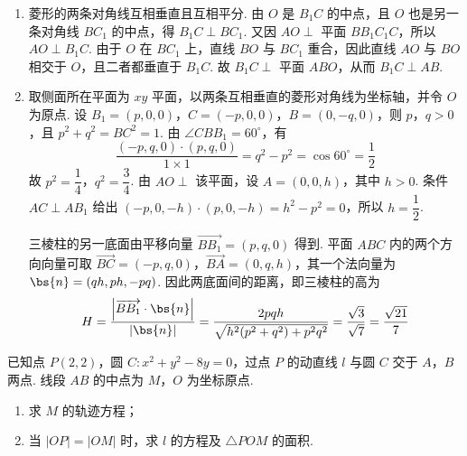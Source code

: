 \begin{solution}
\begin{enumerate}
\item 菱形的两条对角线互相垂直且互相平分. 由 \(O\) 是 \(B_1C\) 的中点，且 \(O\) 也是另一条对角线 \(BC_1\) 的中点，得 \(B_1C\perp BC_1\). 又因 \(AO\perp\) 平面 \(BB_1C_1C\)，所以 \(AO\perp B_1C\). 由于 \(O\) 在 \(BC_1\) 上，直线 \(BO\) 与 \(BC_1\) 重合，因此直线 \(AO\) 与 \(BO\) 相交于 \(O\)，且二者都垂直于 \(B_1C\). 故 \(B_1C\perp\) 平面 \(ABO\)，从而 \(B_1C\perp AB\).
\item 取侧面所在平面为 \(xy\) 平面，以两条互相垂直的菱形对角线为坐标轴，并令 \(O\) 为原点. 设 \(B_1=(p,0,0)\)，\(C=(-p,0,0)\)，\(B=(0,-q,0)\)，则 \(p\)，\(q>0\)，且 \(p^2+q^2=BC^2=1\). 由 \(\angle CBB_1=60^\circ\)，有
\[\frac{(-p,q,0)\cdot(p,q,0)}{1\times1}=q^2-p^2=\cos60^\circ=\frac12\]
故 \(p^2=\dfrac14\)，\(q^2=\dfrac34\). 由 \(AO\perp\) 该平面，设 \(A=(0,0,h)\)，其中 \(h>0\). 条件 \(AC\perp AB_1\) 给出 \((-p,0,-h)\cdot(p,0,-h)=h^2-p^2=0\)，所以 \(h=\dfrac12\).

三棱柱的另一底面由平移向量 \(\overrightarrow{BB_1}=(p,q,0)\) 得到. 平面 \(ABC\) 内的两个方向向量可取 \(\overrightarrow{BC}=(-p,q,0)\)，\(\overrightarrow{BA}=(0,q,h)\)，其一个法向量为 \(\bs{n}=(qh,ph,-pq)\). 因此两底面间的距离，即三棱柱的高为
\[H=\frac{\left|\overrightarrow{BB_1}\cdot\bs{n}\right|}{|\bs{n}|}=\frac{2pqh}{\sqrt{h^2(p^2+q^2)+p^2q^2}}=\frac{\sqrt3}{\sqrt7}=\frac{\sqrt{21}}{7}\]
\end{enumerate}
\end{solution}

\begin{problem}
已知点 \(P(2,2)\)，圆 \(C: x^{2} + y^{2} - 8y = 0\)，过点 \(P\) 的动直线 \(l\) 与圆 \(C\) 交于 \(A\)，\(B\) 两点. 线段 \(AB\) 的中点为 \(M\)，\(O\) 为坐标原点.

\begin{enumerate}
\item 求 \(M\) 的轨迹方程；
\item 当 \(|OP| = |OM|\) 时，求 \(l\) 的方程及 \(\triangle POM\) 的面积.
\end{enumerate}
\end{problem}


